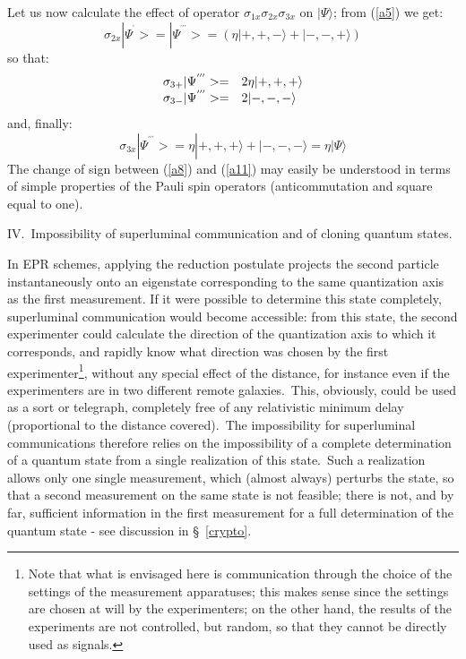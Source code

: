 \documentclass[12pt,onecolumn]{article}%
\begin{document}
Let us now calculate the effect of operator $\sigma_{1x}\sigma_{2x}\sigma
_{3x}$ on $|\Psi\rangle $; from (\ref{a5}) we get:
\begin{equation}
\sigma_{2x}|\Psi^{^{\prime}}>=|\Psi^{^{\prime\prime\prime}}>=\left(
\eta|+,+,-\rangle +|-,-,+\rangle \right)  \label{a9}%
\end{equation}
so that:
\begin{equation}%
\begin{array}
[c]{ll}%
\sigma_{3+}|\Psi^{^{\prime\prime\prime}}>= & 2\eta|+,+,+\rangle \\
\sigma_{3-}|\Psi^{^{\prime\prime\prime}}>= & 2|-,-,-\rangle 
\end{array}
\label{a10}%
\end{equation}
and, finally:
\begin{equation}
\sigma_{3x}|\Psi^{^{\prime\prime\prime}}>=\eta|+,+,+\rangle +|
-,-,-\rangle =\eta|\Psi\rangle  \label{a11}%
\end{equation}
The change of sign between (\ref{a8}) and (\ref{a11}) may easily be understood
in terms of simple properties of the Pauli spin operators (anticommutation and
square equal to one).

\begin{center}
\bigskip\bigskip

\bigskip\bigskip IV.\ Impossibility of superluminal communication and of
cloning quantum states.
\end{center}

In EPR schemes, applying the reduction postulate projects the second particle
instantaneously onto an eigenstate corresponding to the same quantization axis
as the first measurement. If it were possible to determine this state
completely, superluminal communication would become accessible: from this
state, the second experimenter could calculate the direction of the
quantization axis to which it corresponds, and rapidly know what direction was
chosen by the first experimenter\footnote{Note that what is envisaged here is
communication through the choice of the settings of the measurement
apparatuses; this makes sense since the settings are chosen at will by the
experimenters; on the other hand, the results of the experiments are not
controlled, but random, so that they cannot be directly used as signals.},
without any special effect of the distance, for instance even if the
experimenters are in two different remote galaxies.\ This, obviously, could be
used as a sort or telegraph, completely free of any relativistic minimum delay
(proportional to the distance covered).\ The impossibility for superluminal
communications therefore relies on the impossibility of a complete
determination of a quantum state from a single realization of this
state.\ Such a realization allows only one single measurement, which (almost
always) perturbs the state, so that a second measurement on the same state is
not feasible; there is not, and by far, sufficient information in the first
measurement for a full determination of the quantum state - see discussion in
\S \ \ref{crypto}.
\end{document}
